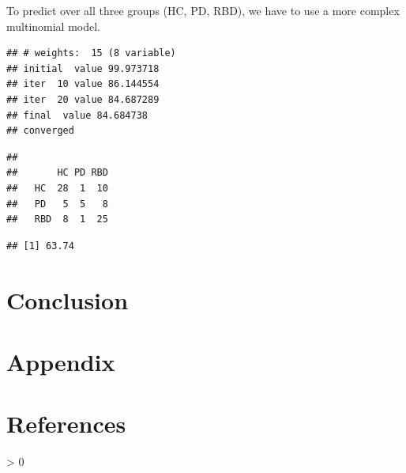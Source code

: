 \documentclass[
  english,
  doc,floatsintext]{apa6}
\newlength{\cslhangindent}
\newenvironment{CSLReferences}[2] %
 {%
  \setlength{\parindent}{0pt}
  \ifodd #1 \everypar{\setlength{\hangindent}{\cslhangindent}}\ignorespaces\fi
  \ifnum #2 > 0
  \setlength{\parskip}{#2\baselineskip}
  \fi
 }%
 {}
\begin{document}
To predict over all three groups (HC, PD, RBD), we have to use a more complex
multinomial model.

\begin{verbatim}
## # weights:  15 (8 variable)
## initial  value 99.973718 
## iter  10 value 86.144554
## iter  20 value 84.687289
## final  value 84.684738 
## converged
\end{verbatim}

\begin{verbatim}
##      
##       HC PD RBD
##   HC  28  1  10
##   PD   5  5   8
##   RBD  8  1  25
\end{verbatim}

\begin{verbatim}
## [1] 63.74
\end{verbatim}

\newpage

\hypertarget{conclusion}{%
\section{Conclusion}\label{conclusion}}

\newpage

\hypertarget{appendix}{%
\section{Appendix}\label{appendix}}

\newpage

\hypertarget{references}{%
\section{References}\label{references}}

\begingroup
\setlength{\parindent}{-0.5in}
\setlength{\leftskip}{0.5in}

\hypertarget{refs}{}
\begin{CSLReferences}{0}{0}
\end{CSLReferences}

\endgroup
\end{document}
